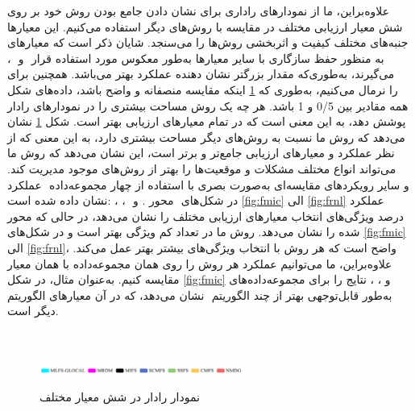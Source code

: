 علاوه‌بر‌این، ما از نمودارهای راداری برای نشان دادن جامع بودن روش خود بر روی شش معیار ارزیابی مختلف در مقایسه با روش‌های دیگر استفاده می‌کنیم. این معیارها جنبه‌های مختلف کیفیت و اثربخشی روش‌ها را می‌سنجد\cite{seyedi2019self}.
شایان ذکر است که معیارهای ‎‎، ‎‎ و ‎ به منظور حفظ سازگاری با سایر معیارها به‌طور معکوس مورد استفاده قرار می‌گیرند، به‌طوری‌که مقدار بزرگتر نشان دهنده عملکرد بهتر می‌باشد. همچنین برای اینکه مقایسه منصفانه و واضح باشد، داده‌های شکل ‎\ref{fig:radar}‎ را نرمال می‌کنیم، به‌طوری که همه مقادیر بین 0/5 و 1 باشد. هر چه یک روش مساحت بیشتری را در نمودارهای رادار پوشش دهد،  به این معنی است که در تمام معیارهای ارزیابی بهتر است. شکل \ref{fig:radar} نشان می‌دهد که روش ما نسبت به روش‌های دیگر مساحت بیشتری دارد، به این معنی که از نظر عملکرد و معیارهای ارزیابی جامع‌‌تر و برتر است، این نشان می‌دهد که روش ما می‌تواند انواع مختلف مشکلات و موقعیت‌ها را بهتر از روش‌های موجود مدیریت کند.
عملکرد ‎‎ و سایر رویکردهای مقایسه‌ای به‌صورت بصری با استفاده از چهار مجموعه‌داده نشان داده شده است: ‎‎، ‎‎، ‎‎ و ‎‎. محور ‎‎ در شکل‌های \ref{fig:fmic} الی \ref{fig:frnl} عملکرد معیارهای ارزیابی مختلف را نشان می‌دهد، در حالی که محور‎  ‎درصد ویژگی‌های انتخاب شده را نشان می‌دهد. روش ما در تعداد کم ویژگی بهتر است و در شکل‌های \ref{fig:fmic} الی \ref{fig:frnl}، واضح است که هر روش با انتخاب ویژگی‌های بیشتر بهتر عمل می‌کند. علاوه‌‌براین، ما می‌توانیم عملکرد هر روش را روی همان مجموعه‌داده با همان معیار مقایسه کنیم. به‌عنوان مثال، در شکل \ref{fig:fmic} نتایج را برای مجموعه‌داده‌های ‎‎، ‎‎، ‎‎ و ‎‎ نشان می‌دهد، که در آن معیارهای الگوریتم ‎‎ به‌طور قابل‌توجهی بهتر از چند الگوریتم دیگر است.
\begin{figure}
	\centering
	\\[0.5cm]
	\\[0.3cm]
	{\includegraphics[width=0.6\textwidth]{figures/Radar/Legend.pdf}}
	\caption{نمودار رادار در شش معیار مختلف}
	\label{fig:radar}
\end{figure}
